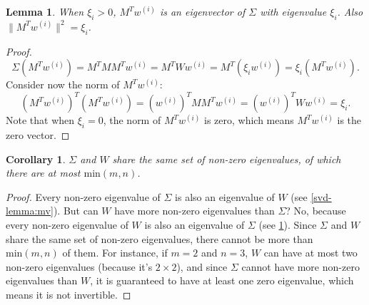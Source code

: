 \documentclass{article}
\newtheorem{corollary}{Corollary}[theorem]
\newtheorem{lemma}[theorem]{Lemma}
\theoremstyle{definition}
\begin{document}
\begin{lemma}
\label{svd-lemma:mtw}
When $\xi_i > 0$, $M^Tw^{(i)}$ is an eigenvector of $\Sigma$ with eigenvalue $\xi_i$. Also $\lVert M^Tw^{(i)} \rVert^2 =  \xi_i$.
\end{lemma}
\begin{proof}
\begin{equation}
    \Sigma(M^Tw^{(i)}) = M^T MM^T w^{(i)} =M^T W w^{(i)} = M^T(\xi_iw^{(i)}) = \xi_i(M^Tw^{(i)}).
\end{equation}
Consider now the norm of $M^Tw^{(i)}$:
\begin{equation}
    (M^Tw^{(i)})^T(M^Tw^{(i)}) = (w^{(i)})^TMM^Tw^{(i)} = (w^{(i)})^TW w^{(i)} = \xi_i.
\end{equation}
Note that when $\xi_i=0$, the norm of $M^Tw^{(i)}$ is zero, which means $M^Tw^{(i)}$ is the zero vector.
\end{proof}

\begin{corollary}
$\Sigma$ and $W$ share the same set of non-zero eigenvalues, of which there are at most $\text{min}(m, n)$.
\end{corollary}
\begin{proof}
Every non-zero eigenvalue of $\Sigma$ is also an eigenvalue of $W$ (see \ref{svd-lemma:mv}). But can $W$ have more non-zero eigenvalues than $\Sigma$? No, because every non-zero eigenvalue of $W$ is also an eigenvalue of $\Sigma$ (see \ref{svd-lemma:mtw}). Since $\Sigma$ and $W$ share the same set of non-zero eigenvalues, there cannot be more than $\text{min}(m, n)$ of them. For instance, if $m=2$ and $n=3$, $W$ can have at most two non-zero eigenvalues (because it's $2\times2$), and since $\Sigma$ cannot have more non-zero eigenvalues than $W$, it is guaranteed to have at least one zero eigenvalue, which means it is not invertible. 
\end{proof}
\end{document}
